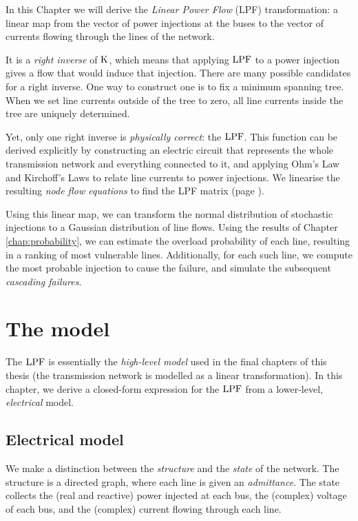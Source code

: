 \documentclass[main.tex]{subfiles}
\begin{document}
In this Chapter we will derive the \emph{Linear Power Flow} (LPF) transformation: a linear map from the vector of power injections at the buses to the vector of currents flowing through the lines of the network.

It is a \emph{right inverse} of $\text{\textup{K}}$, which means that applying $\text{\textup{LPF}}$ to a power injection gives a flow that would induce that injection. There are many possible candidates for a right inverse. One way to construct one is to fix a minimum spanning tree. When we set line currents outside of the tree to zero, all line currents inside the tree are uniquely determined.

Yet, only one right inverse is \emph{physically correct}: the $\text{\textup{LPF}}$. This function can be derived explicitly by constructing an electric circuit that represents the whole transmission network and everything connected to it, and applying Ohm's Law and Kirchoff's Laws to relate line currents to power injections. We linearise the resulting \emph{node flow equations} to find the LPF matrix (page \pageref{eq:LPF}).

Using this linear map, we can transform the normal distribution of stochastic injections to a Gaussian distribution of line flows. Using the results of Chapter \ref{chap:probability}, we can estimate the overload probability of each line, resulting in a ranking of most vulnerable lines. Additionally, for each such line, we compute the most probable injection to cause the failure, and simulate the subsequent \emph{cascading failures}.

\section{The model}
The $\text{\textup{LPF}}$ is essentially the \emph{high-level model} used in the final chapters of this thesis (\ie the transmission network is modelled as a linear transformation). In this chapter, we derive a closed-form expression for the $\text{\textup{LPF}}$ from a lower-level, \emph{electrical} model.

\subsection{Electrical model}
We make a distinction between the \emph{structure} and the \emph{state} of the network. The structure is a directed graph, where each line is given an \emph{admittance}. The state collects the (real and reactive) power injected at each bus, the (complex) voltage of each bus, and the (complex) current flowing through each line.
\end{document}
